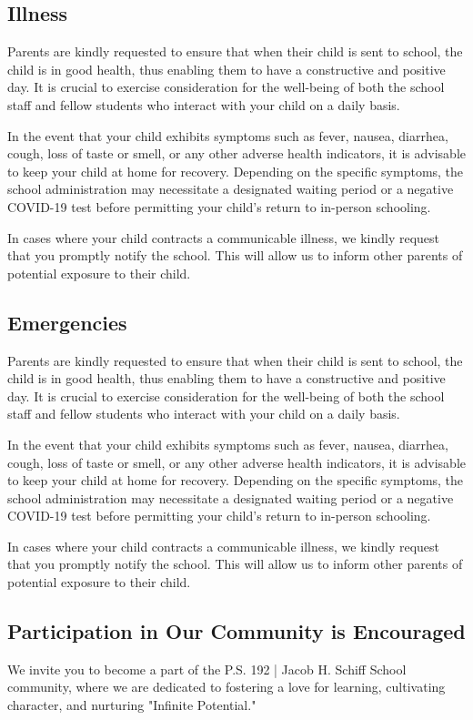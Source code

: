 \documentclass[11pt]{article}
\begin{document}
\subsection{Illness}
\label{sec:org9cfc642}
Parents are kindly requested to ensure that when their child is sent to school, the child is in good health, thus enabling them to have a constructive and positive day. It is crucial to exercise consideration for the well-being of both the school staff and fellow students who interact with your child on a daily basis.

In the event that your child exhibits symptoms such as fever, nausea, diarrhea, cough, loss of taste or smell, or any other adverse health indicators, it is advisable to keep your child at home for recovery. Depending on the specific symptoms, the school administration may necessitate a designated waiting period or a negative COVID-19 test before permitting your child’s return to in-person schooling.

In cases where your child contracts a communicable illness, we kindly request that you promptly notify the school. This will allow us to inform other parents of potential exposure to their child.

\subsection{Emergencies}
\label{sec:orgeb56674}
Parents are kindly requested to ensure that when their child is sent to school, the child is in good health, thus enabling them to have a constructive and positive day. It is crucial to exercise consideration for the well-being of both the school staff and fellow students who interact with your child on a daily basis.

In the event that your child exhibits symptoms such as fever, nausea, diarrhea, cough, loss of taste or smell, or any other adverse health indicators, it is advisable to keep your child at home for recovery. Depending on the specific symptoms, the school administration may necessitate a designated waiting period or a negative COVID-19 test before permitting your child’s return to in-person schooling.

In cases where your child contracts a communicable illness, we kindly request that you promptly notify the school. This will allow us to inform other parents of potential exposure to their child.

\subsection{Participation in Our Community is Encouraged}
\label{sec:org4eca5b5}
We invite you to become a part of the P.S. 192 | Jacob H. Schiff School community, where we are dedicated to fostering a love for learning, cultivating character, and nurturing "Infinite Potential."
\end{document}
